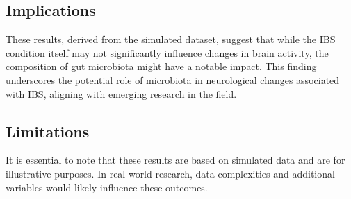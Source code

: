 \documentclass[11pt,a4paper]{article}
\begin{document}
\subsection*{Implications}

These results, derived from the simulated dataset, suggest that while the IBS condition itself may not significantly influence changes in brain activity, the composition of gut microbiota might have a notable impact. This finding underscores the potential role of microbiota in neurological changes associated with IBS, aligning with emerging research in the field.

\subsection*{Limitations}

It is essential to note that these results are based on simulated data and are for illustrative purposes. In real-world research, data complexities and additional variables would likely influence these outcomes.
\end{document}
